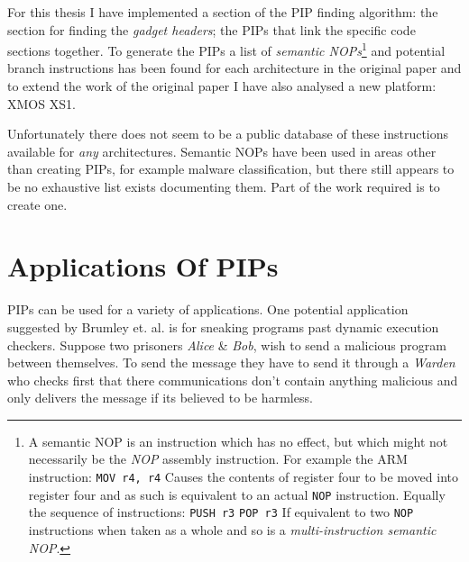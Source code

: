 \documentclass[10pt,]{book}
\begin{document}
For this thesis I have implemented a section of the PIP finding
algorithm: the section for finding the \emph{gadget headers}; the PIPs
that link the specific code sections together. To generate the PIPs a
list of \emph{semantic NOPs}\footnote{A semantic NOP is an instruction
  which has no effect, but which might not necessarily be the \emph{NOP}
  assembly instruction. For example the ARM instruction:
  \lstinline!MOV r4, r4! Causes the contents of register four to be
  moved into register four and as such is equivalent to an actual
  \lstinline!NOP! instruction. Equally the sequence of instructions:
  \lstinline!PUSH r3! \lstinline!POP r3! If equivalent to two
  \lstinline!NOP! instructions when taken as a whole and so is a
  \emph{multi-instruction semantic NOP}.} and potential branch
instructions has been found for each architecture in the original paper
and to extend the work of the original paper I have also analysed a new
platform: XMOS XS1.

Unfortunately there does not seem to be a public database of these
instructions available for \emph{any} architectures. Semantic NOPs have
been used in areas other than creating PIPs, for example malware
classification\autocite{Bilar:2007uu}\autocite{Preda:2007ky}, but there
still appears to be no exhaustive list exists documenting them. Part of
the work required is to create one.

\section{Applications Of PIPs}

PIPs can be used for a variety of applications. One potential
application suggested by Brumley et. al.\autocite{Cha:2010uh} is for
sneaking programs past dynamic execution checkers. Suppose two prisoners
\emph{Alice} \& \emph{Bob}, wish to send a malicious program between
themselves. To send the message they have to send it through a
\emph{Warden} who checks first that there communications don't contain
anything malicious and only delivers the message if its believed to be
harmless.
\end{document}
